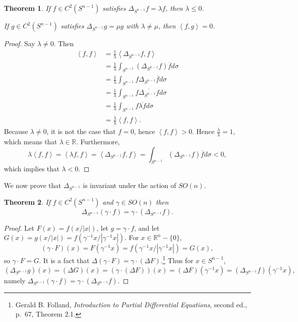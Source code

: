 \documentclass{article}
\newcommand{\inner}[2]{\left\langle #1, #2 \right\rangle}
\newtheorem{theorem}{Theorem}
\theoremstyle{definition}
\begin{document}
\begin{theorem}
If $f \in C^2(S^{n-1})$ satisfies $\Delta_{S^{n-1}}f = \lambda f$, then $\lambda \leq 0$.

If $g \in C^2(S^{n-1})$ satisfies
$\Delta_{S^{n-1}} g = \mu g$ with $\lambda \neq \mu$, then
$\inner{f}{g} = 0$.
\label{orthogonal}
\end{theorem}
\begin{proof}
Say $\lambda \neq 0$. Then
\begin{align*}
\inner{f}{f} &= \frac{1}{\lambda} \inner{\Delta_{S^{n-1}}f}{f}\\
&= \frac{1}{\lambda} \int_{S^{n-1}} (\Delta_{S^{n-1}}f) \overline{f} d\sigma\\
&=\frac{1}{\lambda} \int_{S^{n-1}} f \Delta_{S^{n-1}} \overline{f} d\sigma\\
&=\frac{1}{\lambda} \int_{S^{n-1}} f \overline{\Delta_{S^{n-1}} f} d\sigma\\
&=\frac{1}{\lambda} \int_{S^{n-1}} f \overline{\lambda f} d\sigma\\
&=\frac{\overline{\lambda}}{\lambda} \inner{f}{f}.
\end{align*}
Because $\lambda \neq 0$, it is not the case that $f =0$, hence $\inner{f}{f}>0$. Hence
$\frac{\overline{\lambda}}{\lambda}=1$, which means that $\lambda \in \mathbb{R}$.
Furthermore,
\[
\lambda \inner{f}{f} = \inner{\lambda f}{f} = \inner{\Delta_{S^{n-1}} f}{f}
=\int_{S^{n-1}} (\Delta_{S^{n-1}} f) \overline{f} d\sigma <0,
\]
which implies that $\lambda<0$. 
\end{proof}


We now prove that $\Delta_{S^{n-1}}$ is invariant under the action of $SO(n)$.

\begin{theorem}
If $f \in C^2(S^{n-1})$ and $\gamma \in SO(n)$ then
\[
\Delta_{S^{n-1}} (\gamma \cdot f) = \gamma \cdot (\Delta_{S^{n-1}} f).
\]
\end{theorem}
\begin{proof}
Let $F(x)=f(x/|x|)$, let $g = \gamma \cdot f$, and let $G(x) =g(x/|x|)= f(\gamma^{-1}x/|\gamma^{-1}x|)$.
For $x \in \mathbb{R}^n - \{0\}$,
\[
(\gamma \cdot F)(x) = F(\gamma^{-1}x) = f(\gamma^{-1}x/|\gamma^{-1}x|) = 
G(x),
\]
so $\gamma \cdot F = G$. 
It is a fact that $\Delta (\gamma \cdot F) = \gamma \cdot (\Delta F)$.\footnote{Gerald
B. Folland, {\em Introduction to Partial Differential Equations}, second ed., p.~67, Theorem 2.1.}
Thus for $x \in S^{n-1}$,
\[
(\Delta_{S^{n-1}} g)(x)=
(\Delta G)(x)= (\gamma \cdot (\Delta F))(x)
=(\Delta F)(\gamma^{-1}x)
=(\Delta_{S^{n-1}} f)(\gamma^{-1}x),
\]
namely $\Delta_{S^{n-1}}(\gamma \cdot f) = \gamma \cdot (\Delta_{S^{n-1}} f)$.
\end{proof}
\end{document}
